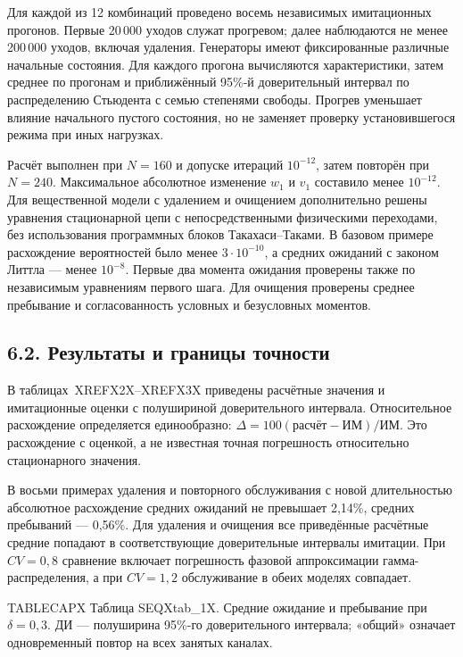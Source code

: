 Для каждой из 12 комбинаций проведено восемь независимых имитационных прогонов. Первые 20\,000 уходов служат прогревом; далее наблюдаются не менее 200\,000 уходов, включая удаления. Генераторы имеют фиксированные различные начальные состояния. Для каждого прогона вычисляются характеристики, затем среднее по прогонам и приближённый 95\%-й доверительный интервал по распределению Стьюдента с семью степенями свободы. Прогрев уменьшает влияние начального пустого состояния, но не заменяет проверку установившегося режима при иных нагрузках.

Расчёт выполнен при \(N=160\) и допуске итераций \(10^{-12}\), затем повторён при \(N=240.\) Максимальное абсолютное изменение \(w_1\) и \(v_1\) составило менее \(10^{-12}.\) Для вещественной модели с удалением и очищением дополнительно решены уравнения стационарной цепи с непосредственными физическими переходами, без использования программных блоков Такахаси--Таками. В базовом примере расхождение вероятностей было менее \(3\cdot10^{-10}\), а средних ожиданий с законом Литтла --- менее \(10^{-8}.\) Первые два момента ожидания проверены также по независимым уравнениям первого шага. Для очищения проверены среднее пребывание и согласованность условных и безусловных моментов.

\subsection*{6.2. Результаты и границы точности}
В таблицах~XREFX2X--XREFX3X приведены расчётные значения и имитационные оценки с полушириной доверительного интервала. Относительное расхождение определяется единообразно: \(\Delta=100(\text{расчёт}-\text{ИМ})/\text{ИМ}.\) Это расхождение с оценкой, а не известная точная погрешность относительно стационарного значения.

В восьми примерах удаления и повторного обслуживания с новой длительностью абсолютное расхождение средних ожиданий не превышает 2{,}14\%, средних пребываний --- 0{,}56\%. Для удаления и очищения все приведённые расчётные средние попадают в соответствующие доверительные интервалы имитации. При \(CV=0{,}8\) сравнение включает погрешность фазовой аппроксимации гамма-распределения, а при \(CV=1{,}2\) обслуживание в обеих моделях совпадает.

\noindent TABLECAPX Таблица SEQXtab_1X. Средние ожидание и пребывание при $\delta=0{,}3$. ДИ --- полуширина 95\%-го доверительного интервала; «общий» означает одновременный повтор на всех занятых каналах.\par

